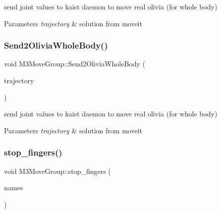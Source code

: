 send joint values to kaist daemon to move real olivia (for whole body) 


\begin{DoxyParams}{Parameters}
{\em trajectory} & solution from moveit \\
\hline
\end{DoxyParams}
\mbox{\label{classM3MoveGroup_a8adcfcf74c2e2350189be855dca572de}} 
\subsubsection{\texorpdfstring{Send2\+Olivia\+Whole\+Body()}{Send2OliviaWholeBody()}\hspace{0.1cm}{\footnotesize\ttfamily [2/2]}}
{\footnotesize\ttfamily void M3\+Move\+Group\+::\+Send2\+Olivia\+Whole\+Body (\begin{DoxyParamCaption}\item[{moveit\+\_\+msgs\+::\+Robot\+Trajectory}]{trajectory }\end{DoxyParamCaption})\hspace{0.3cm}{\ttfamily [inline]}}



send joint values to kaist daemon to move real olivia (for whole body) 


\begin{DoxyParams}{Parameters}
{\em trajectory} & solution from moveit \\
\hline
\end{DoxyParams}
\mbox{\label{classM3MoveGroup_aedb5d4a4aaeebd2ef3fa0d54edb0efaa}} 
\subsubsection{\texorpdfstring{stop\+\_\+fingers()}{stop\_fingers()}\hspace{0.1cm}{\footnotesize\ttfamily [1/2]}}
{\footnotesize\ttfamily void M3\+Move\+Group\+::stop\+\_\+fingers (\begin{DoxyParamCaption}\item[{std\+::vector$<$ std\+::string $>$}]{names }\end{DoxyParamCaption})\hspace{0.3cm}{\ttfamily [inline]}}




